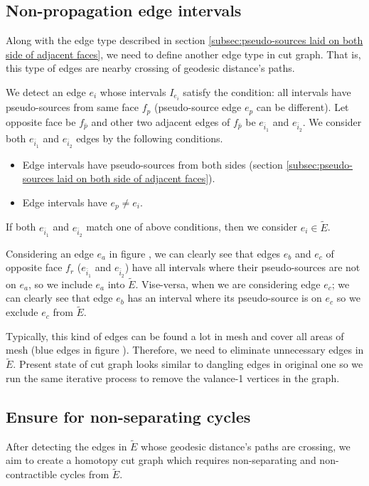 \documentclass[a4paper,twoside]{article}
\begin{document}
\subsection{Non-propagation edge intervals}
\label{subsec:intervals fail to propagate}
Along with the edge type described in section \ref{subsec:pseudo-sources laid on both side of adjacent faces},  we need to define another edge type in cut graph. That is, this type of edges are nearby crossing of geodesic distance's paths.

We detect an edge $e_i$ whose intervals $I_{e_i}$ satisfy the condition: all intervals have pseudo-sources from same face $f_p$ (pseudo-source edge $e_p$ can be different). Let opposite face be $f_{\bar{p}}$ and other two adjacent edges of $f_{\bar{p}}$ be $e_{\bar{i}_1}$ and $e_{\bar{i}_2}$. We consider both $e_{\bar{i}_1}$ and $e_{\bar{i}_2}$ edges by the following conditions.
\begin{itemize}[noitemsep,topsep=10pt]
	  \setlength{\itemsep}{5pt}%
	  \setlength{\parskip}{0cm}%
	\item Edge intervals have pseudo-sources from both sides (section \ref{subsec:pseudo-sources laid on both side of adjacent faces}).
	\item Edge intervals have $e_p \neq e_i$.
\end{itemize}

If both $e_{\bar{i}_1}$ and $e_{\bar{i}_2}$ match one of above conditions, then we consider $e_i \in \tilde{E}$. 

Considering an edge $e_a$ in figure , we can clearly see that edges $e_b$ and $e_c$ of opposite face $f_r$ ($e_{\bar{i}_1}$ and $e_{\bar{i}_2}$) have all intervals where their pseudo-sources are not on $e_a$, so we include $e_a$ into $\tilde{E}$. Vise-versa, when we are considering edge $e_c$; we can clearly see that edge $e_b$ has an interval where its pseudo-source is on $e_c$ so we exclude $e_c$ from $\tilde{E}$.

Typically, this kind of edges can be found a lot in mesh and cover all areas of mesh (blue edges in figure ). Therefore, we need to eliminate unnecessary edges in $\tilde{E}$. Present state of cut graph looks similar to dangling edges in original one so we run the same iterative process to remove the valance-1 vertices in the graph. 



\subsection{Ensure for non-separating cycles}
\label{subsec:ensure non-trivia}
After detecting the edges in $\tilde{E}$ whose geodesic distance's paths are crossing, we aim to create a homotopy cut graph which requires non-separating and non-contractible cycles from $\tilde{E}$.
\end{document}

